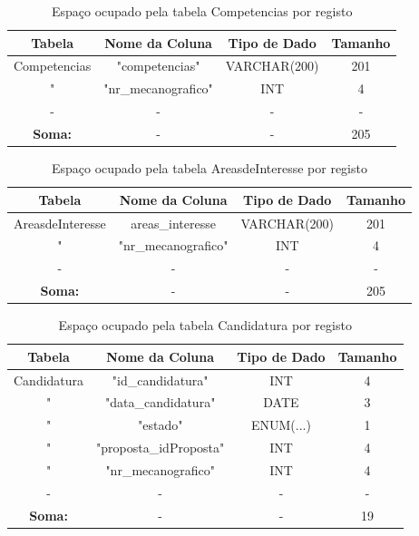 \documentclass[12pt,a4paper]{article}
\renewcommand{\arraystretch}{1.5}  %
\begin{document}
\begin{table}[H]
\centering
\renewcommand{\arraystretch}{1.2}
\begin{tabular}{|c|c|c|c|}
\hline
\textbf{Tabela} & \textbf{Nome da Coluna} & \textbf{Tipo de Dado} & \textbf{Tamanho} \\ \hline
Competencias & "competencias" & VARCHAR(200) & 201 \\ \hline
"& "nr\_mecanografico" & INT & 4 \\ \hline
- & - & - & - \\ \hline
\textbf{Soma:} & - & - & 205 \\ \hline
\end{tabular}

\caption{Espaço ocupado pela tabela Competencias por registo}
\end{table}

\begin{table}[H]
\centering
\renewcommand{\arraystretch}{1.2}
\begin{tabular}{|c|c|c|c|}
\hline
\textbf{Tabela} & \textbf{Nome da Coluna} & \textbf{Tipo de Dado} & \textbf{Tamanho} \\ \hline
AreasdeInteresse & areas\_interesse & VARCHAR(200) & 201 \\ \hline
"&  "nr\_mecanografico" & INT & 4 \\ \hline
- & - & - & - \\ \hline
\textbf{Soma:} & - & - & 205 \\ \hline
\end{tabular}

\caption{Espaço ocupado pela tabela AreasdeInteresse por registo}
\end{table}

\begin{table}[H]
\centering
\renewcommand{\arraystretch}{1.2}
\begin{tabular}{|c|c|c|c|}
\hline
\textbf{Tabela} & \textbf{Nome da Coluna} & \textbf{Tipo de Dado} & \textbf{Tamanho} \\ \hline
Candidatura & "id\_candidatura" & INT & 4 \\ \hline
"& "data\_candidatura" & DATE & 3 \\ \hline
"& "estado" & ENUM(...) & 1 \\ \hline
"& "proposta\_idProposta" & INT & 4 \\ \hline
"& "nr\_mecanografico" & INT & 4 \\ \hline
- & - & - & - \\ \hline
\textbf{Soma:} & - & - & 19 \\ \hline
\end{tabular}

\caption{Espaço ocupado pela tabela Candidatura por registo}
\end{table}
\end{document}
